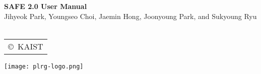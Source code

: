 \documentclass[oneside,openany,a4paper,10pt]{book}
\begin{document}
\begin{titlepage}
    \vspace*{15em}
    \centering
    {\bfseries\Huge
        SAFE 2.0 User Manual\\
    }    
        \vskip2cm
       {\Large
 Jihyeok Park, Youngseo Choi, Jaemin Hong, Joonyoung Park, and Sukyoung Ryu}\\
~\\
\large
\begin{tabular}{c}
                        \copyright\ KAIST
\end{tabular}
\texttt{[image: plrg-logo.png]}
\end{titlepage}

\multibegin
\raggedcolumns









\normalsize



\multiend
\end{document}
